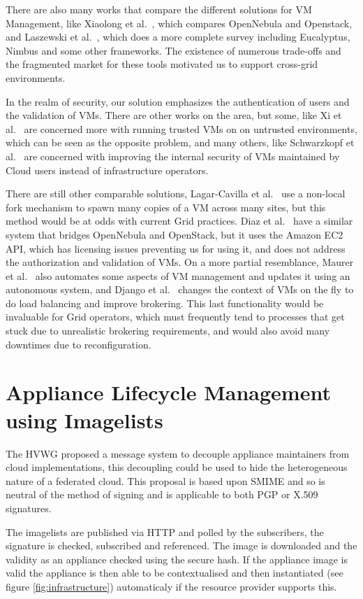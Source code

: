 \documentclass{cai}
\begin{document}
There are also many works that compare the different solutions for VM Management, like Xiaolong et al.~\cite{Xiaolong2012}, which compares OpenNebula and Openstack, and Laszewski et al.~\cite{Laszewski2012}, which does a more complete survey including Eucalyptus, Nimbus and some other frameworks. The existence of numerous trade-offs and the fragmented market for these tools motivated us to support cross-grid environments.

In the realm of security, our solution emphasizes the authentication of users and the validation of VMs. There are other works on the area, but some, like Xi et al.~\cite{Xi2012} are concerned more with running trusted VMs on on untrusted environments, which can be seen as the opposite problem, and many others, like Schwarzkopf et al.~\cite{Schwarzkopf2012} are concerned with improving the internal security of VMs maintained by Cloud users instead of infrastructure operators.

There are still other comparable solutions, Lagar-Cavilla et al.~\cite{Lagar-Cavilla2009} use a non-local fork mechanism to spawn many copies of a VM across many sites, but this method would be at odds with current Grid practices. Diaz et al.~\cite{Diaz2012} have a similar system that bridges OpenNebula and OpenStack, but it uses the Amazon EC2 API, which has licensing issues preventing us for using it, and does not address the authorization and validation of VMs. On a more partial resemblance, Maurer et al.~\cite{Maurer2013} also automates some aspects of VM management and updates it using an autonomous system, and Django et al.~\cite{Django2013} changes the context of VMs on the fly to do load balancing and improve brokering. This last functionality would be invaluable for Grid operators, which must frequently tend to processes that get stuck due to unrealistic brokering requirements, and would also avoid many downtimes due to reconfiguration.


\section{Appliance Lifecycle Management using Imagelists}
\label{sect-vmcaster}
The HVWG proposed a message system to decouple appliance maintainers from cloud implementations, this decoupling could be used to hide the heterogeneous nature of a federated cloud. 
This proposal is based upon SMIME and so is neutral of the method of signing and is applicable to both PGP or X.509 signatures.

The imagelists are published via HTTP and polled by the subscribers, the signature is checked, subscribed and referenced. The image is downloaded and the validity as an appliance checked using the secure hash. 
If the appliance image is valid the appliance is then able to be contextualised and then instantiated (see figure \ref{fig:infrastructure}) automaticaly if the resource provider supports this.
\end{document}
